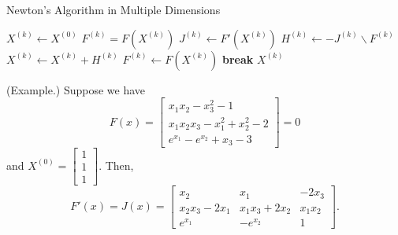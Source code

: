 \documentclass[letterpaper]{article}
\begin{document}
\begin{algorithm}[H]
    \caption{Newton's Algorithm in Multiple Dimensions}
    \label{alg:three}
    \begin{algorithmic}[1]
            \State $X^{(k)} \gets X^{(0)}$
            \State $F^{(k)} = F(X^{(k)})$
                \State $J^{(k)} \gets F'(X^{(k)})$
                \State $H^{(k)} \gets -J^{(k)} \backslash F^{(k)}$ 
                \State $X^{(k)} \gets X^{(k)} + H^{(k)}$
                \State $F^{(k)} \gets F(X^{(k)})$
                    \State \textbf{break} 
                \EndIf
            \EndFor 
            \State \Return $X^{(k)}$
        \EndFunction
    \end{algorithmic}
\end{algorithm}

\begin{mdframed}
    (Example.) Suppose we have \[F(x) = \begin{bmatrix}
        x_1 x_2 - x_3^2 - 1 \\ 
        x_1 x_2 x_3 - x_1^2 + x_2^2 - 2 \\ 
        e^{x_1} - e^{x_2} + x_3 - 3
    \end{bmatrix} = 0\]
    and $X^{(0)} = \begin{bmatrix}
        1\\1\\1
    \end{bmatrix}.$ Then, 
    \[F'(x) = J(x) = \begin{bmatrix}
        x_2 & x_1 & -2x_3 \\ 
        x_2 x_3 - 2x_1 & x_1 x_3 + 2x_2 & x_1 x_2 \\
        e^{x_1} & -e^{x_2} & 1
    \end{bmatrix}.\]
\end{mdframed}
\end{document}

